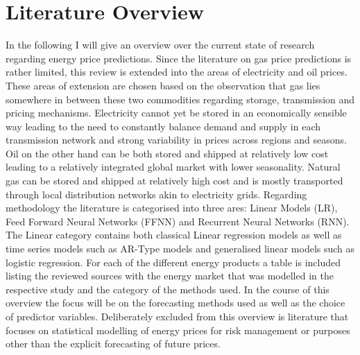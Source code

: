 \chapter{Literature Overview} \label{sec:Literature}
In the following I will give an overview over the current state of research regarding energy price predictions. Since the literature on gas price predictions is rather limited, this review is extended into the areas of electricity and oil prices. 
These areas of extension are chosen based on the observation that gas lies somewhere in between these two commodities regarding storage, transmission and pricing mechanisms. Electricity cannot yet be stored in an economically sensible way leading to the need to constantly balance demand and supply in each transmission network and strong variability in prices across regions and seasons. Oil on the other hand can be both stored and shipped at relatively low cost leading to a relatively integrated global market with lower seasonality. Natural gas can be stored and shipped at relatively high cost and is mostly transported through local distribution networks akin to electricity grids. Regarding methodology the literature is categorised into three ares: Linear Models (LR), Feed Forward Neural Networks (FFNN) and Recurrent Neural Networks (RNN). The Linear category contains both classical Linear regression models as well as time series models such as AR-Type models and generalised linear models such as logistic regression. For each of the different energy products a table is included listing the reviewed sources with the energy market that was modelled in the respective study and the category of the methods used. In the course of this overview the focus will be on the forecasting methods used as well as the choice of predictor variables. Deliberately excluded from this overview is literature that focuses on statistical modelling of energy prices for risk management or purposes other than the explicit forecasting of future prices.


